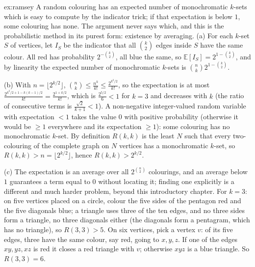 \begin{solution}{ex:ramsey}
\idea A random colouring has an expected number of monochromatic $k$-sets which is easy to compute by the indicator trick; if that expectation is below $1$, some colouring has none. The argument never says which, and this is the probabilistic method in its purest form: existence by averaging.
\writeup (a) For each $k$-set $S$ of vertices, let $I_S$ be the indicator that all $\binom k2$ edges inside $S$ have the same colour. All red has probability $2^{-\binom k2}$, all blue the same, so $\mathbb E[I_S]=2^{1-\binom k2}$, and by linearity the expected number of monochromatic $k$-sets is $\binom nk2^{1-\binom k2}$.

(b) With $n=\lfloor2^{k/2}\rfloor$, $\binom nk\le\frac{n^k}{k!}\le\frac{2^{k^2/2}}{k!}$, so the expectation is at most $\frac{2^{k^2/2+1-k(k-1)/2}}{k!}=\frac{2^{1+k/2}}{k!}$, which is $\frac{2^{5/2}}6<1$ for $k=3$ and decreases with $k$ (the ratio of consecutive terms is $\frac{\sqrt2}{k+1}<1$). A non-negative integer-valued random variable with expectation $<1$ takes the value $0$ with positive probability (otherwise it would be $\ge1$ everywhere and its expectation $\ge1$): some colouring has no monochromatic $k$-set. By definition $R(k,k)$ is the least $N$ such that every two-colouring of the complete graph on $N$ vertices has a monochromatic $k$-set, so $R(k,k)>n=\lfloor2^{k/2}\rfloor$, hence $R(k,k)>2^{k/2}$.

(c) The expectation is an average over all $2^{\binom n2}$ colourings, and an average below $1$ guarantees a term equal to $0$ without locating it; finding one explicitly is a different and much harder problem, beyond this introductory chapter. For $k=3$: on five vertices placed on a circle, colour the five sides of the pentagon red and the five diagonals blue; a triangle uses three of the ten edges, and no three sides form a triangle, no three diagonals either (the diagonals form a pentagram, which has no triangle), so $R(3,3)>5$. On six vertices, pick a vertex $v$: of its five edges, three have the same colour, say red, going to $x,y,z$. If one of the edges $xy,yz,xz$ is red it closes a red triangle with $v$; otherwise $xyz$ is a blue triangle. So $R(3,3)=6$.
\end{solution}


